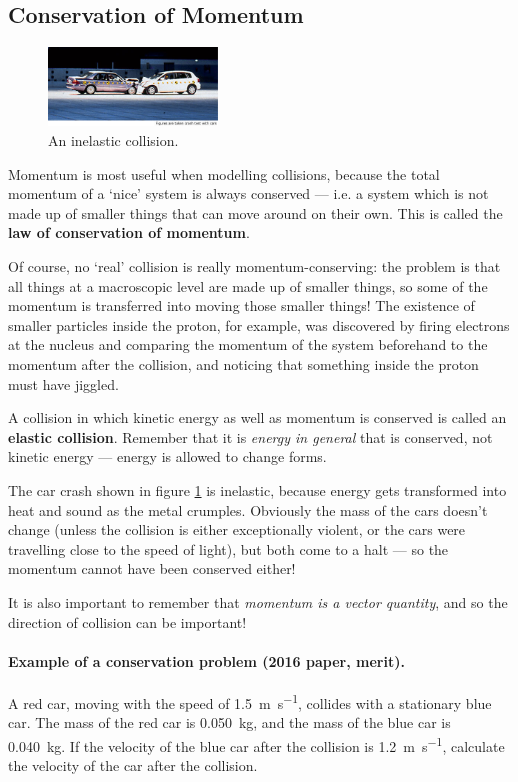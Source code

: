 \documentclass[a4paper]{amsbook}
\newcommand\capcite[1]{}
\begin{document}
\subsection{Conservation of Momentum}
\begin{figure}
  \centering
  \includegraphics[width=0.4\textwidth]{carcrash}
  \caption{An inelastic collision. \capcite{http://world.honda.com/factbook/auto/motorshow/200110/img/12_p02.jpg}\label{fig:baddriver}}
\end{figure}
Momentum is most useful when modelling collisions, because the total momentum of a `nice' system is always conserved --- i.e. a system which is
not made up of smaller things that can move around on their own. This is called the \textbf{law of conservation of momentum}.

Of course, no `real' collision is really momentum-conserving: the problem is that all things at a macroscopic level are made up of smaller things,
so some of the momentum is transferred into moving those smaller things! The existence of smaller particles inside the proton, for example, was
discovered by firing electrons at the nucleus and comparing the momentum of the system beforehand to the momentum after the collision, and noticing
that something inside the proton must have jiggled.

A collision in which kinetic energy as well as momentum is conserved is called an \textbf{elastic collision}. Remember that it is \emph{energy in general} that
is conserved, not kinetic energy --- energy is allowed to change forms.

The car crash shown in figure \ref{fig:baddriver} is inelastic, because energy gets transformed into heat and sound as the metal
crumples. Obviously the mass of the cars doesn't change (unless the collision is either exceptionally violent, or the cars were
travelling close to the speed of light), but both come to a halt --- so the momentum cannot have been conserved either!

It is also important to remember that \textit{momentum is a vector quantity}, and so the direction of collision can be important!

\paragraph{Example of a conservation problem (2016 paper, merit).} A red car, moving with the speed of \SI{1.5}{\metre\per\second},
collides with a stationary blue car. The mass of the red car is \SI{0.050}{\kilo\gram}, and the mass of the blue car is
\SI{0.040}{\kilo\gram}. If the velocity of the blue car after the collision is \SI{1.2}{\metre\per\second}, calculate the
velocity of the car after the collision.
\end{document}
